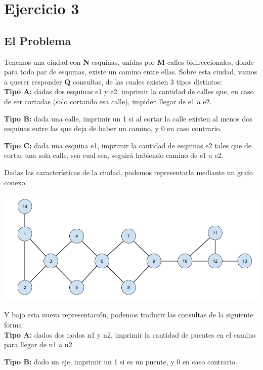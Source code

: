 \section{Ejercicio 3}

\subsection{El Problema}
Tenemos una ciudad con \textbf{N} esquinas, unidas por \textbf{M} calles bidireccionales, donde para todo par de esquinas, existe un camino entre ellas. Sobre esta ciudad, vamos a querer responder \textbf{Q} consultas, de las cuales existen 3 tipos distintos: \\

\textbf{Tipo A:} dadas dos esquinas e1 y e2, imprimir la cantidad de calles que, en caso de ser cortadas (solo cortando esa calle), impiden llegar de e1 a e2.

\textbf{Tipo B:} dada una calle, imprimir un 1 si al cortar la calle existen al menos dos esquinas entre las que deja de haber un camino, y 0 en caso contrario.

\textbf{Tipo C:} dada una esquina e1, imprimir la cantidad de esquinas e2 tales que de cortar una sola calle, sea cual sea, seguirá habiendo camino de e1 a e2.

\hfill \break \noindent
Dadas las características de la ciudad, podemos representarla mediante un grafo conexo.

\includegraphics[scale=0.4]{Imagenes/Imagen1}

\noindent
Y bajo esta nueva representación, podemos traducir las consultas de la siguiente forma: \\

\textbf{Tipo A:} dados dos nodos n1 y n2, imprimir la cantidad de puentes en el camino para llegar de n1 a n2.

\textbf{Tipo B:} dado un eje, imprimir un 1 si es un puente, y 0 en caso contrario.

